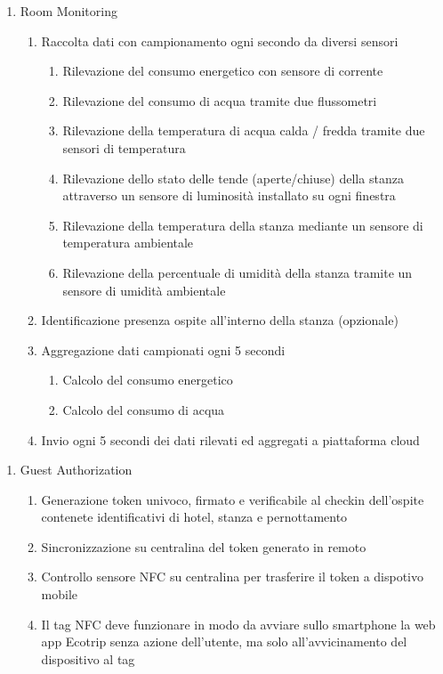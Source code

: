 \begin{enumerate}
    \begin{enumerate}
        \item Room Monitoring
        \begin{enumerate}
            \item Raccolta dati con campionamento ogni secondo da diversi sensori
            \begin{enumerate}
                \item Rilevazione del consumo energetico con sensore di corrente
                \item Rilevazione del consumo di acqua tramite due flussometri
                \item Rilevazione della temperatura di acqua calda / fredda tramite due sensori di temperatura
                \item Rilevazione dello stato delle tende (aperte/chiuse) della stanza attraverso un sensore di luminosità installato su ogni finestra
                \item Rilevazione della temperatura della stanza mediante un sensore di temperatura ambientale
                \item Rilevazione della percentuale di umidità della stanza tramite un sensore di umidità ambientale
            \end{enumerate}
            \item Identificazione presenza ospite all'interno della stanza (opzionale)
            \item Aggregazione dati campionati ogni 5 secondi
            \begin{enumerate}
                \item Calcolo del consumo energetico
                \item Calcolo del consumo di acqua
            \end{enumerate}
            \item Invio ogni 5 secondi dei dati rilevati ed aggregati a piattaforma cloud
        \end{enumerate}
    \end{enumerate}

    \begin{enumerate}
        \item Guest Authorization
        \begin{enumerate}
            \item Generazione token univoco, firmato e verificabile al checkin dell'ospite contenete identificativi di hotel, stanza e pernottamento
            \item Sincronizzazione su centralina del token generato in remoto
            \item Controllo sensore NFC su centralina per trasferire il token a dispotivo mobile
            \item Il tag NFC deve funzionare in modo da avviare sullo smartphone la web app Ecotrip senza azione dell'utente, 
                    ma solo all'avvicinamento del dispositivo al tag
        \end{enumerate}
    \end{enumerate}


\end{enumerate}
